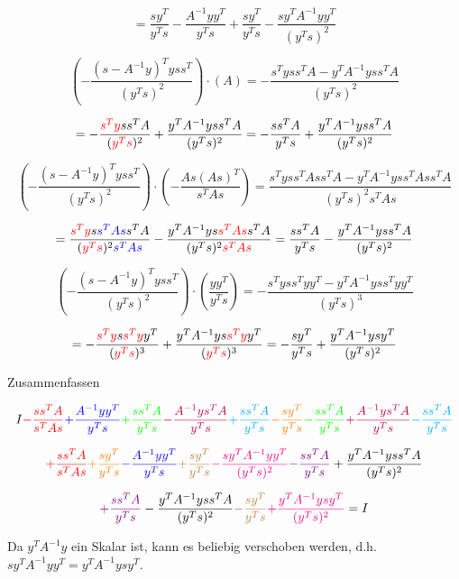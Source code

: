 \documentclass[a4paper, 12pt]{report}
\begin{document}
$$= \frac{sy^T}{y^Ts} - \frac{A^{-1}yy^T}{y^Ts} + \frac{sy^T}{y^Ts} - \frac{sy^TA^{-1}yy^T}{(y^Ts)^2}$$

$$\left( - \frac{(s - A^{-1}y)^Tyss^T}{(y^Ts)^2} \right)\cdot \left(A \right) = -\frac{s^Tyss^TA - y^TA^{-1}yss^TA}{(y^Ts)^2}$$

$$= -\frac{\textcolor{red}{s^Ty}ss^TA}{(\textcolor{red}{y^Ts})^2} + \frac{y^TA^{-1}yss^TA}{(y^Ts)^2} = -\frac{ss^TA}{y^Ts} + \frac{y^TA^{-1}yss^TA}{(y^Ts)^2}$$

$$\left(  - \frac{(s - A^{-1}y)^Tyss^T}{(y^Ts)^2} \right)\cdot \left( - \frac{As(As)^T}{s^TAs} \right) = \frac{s^Tyss^TAss^TA - y^TA^{-1}yss^TAss^TA}{(y^Ts)^2s^TAs}$$

$$= \frac{\textcolor{red}{s^Ty}s\textcolor{blue}{s^TAs}s^TA}{(\textcolor{red}{y^Ts})^2\textcolor{blue}{s^TAs}} - \frac{y^TA^{-1}ys\textcolor{red}{s^TAs}s^TA}{(y^Ts)^2\textcolor{red}{s^TAs}} = \frac{ss^TA}{y^Ts} - \frac{y^TA^{-1}yss^TA}{(y^Ts)^2}$$

$$\left(  - \frac{(s - A^{-1}y)^Tyss^T}{(y^Ts)^2} \right)\cdot \left( \frac{yy^T}{y^Ts} \right) = -\frac{s^Tyss^Tyy^T - y^TA^{-1}yss^Tyy^T}{(y^Ts)^3} $$

$$= -\frac{\textcolor{red}{s^Ty}s\textcolor{red}{s^Ty}y^T}{(\textcolor{red}{y^Ts})^3} + \frac{y^TA^{-1}ys\textcolor{red}{s^Ty}y^T}{(\textcolor{red}{y^Ts})^3} = -\frac{sy^T}{y^Ts} + \frac{y^TA^{-1}ysy^T}{(y^Ts)^2}$$

Zusammenfassen

$$ I \textcolor{red}{-\frac{ss^TA}{s^TAs}} \textcolor{blue}{+\frac{A^{-1}yy^T}{y^Ts}} \textcolor{green}{+\frac{ss^TA}{y^Ts}} \textcolor{purple}{-\frac{A^{-1}ys^TA}{y^Ts}} \textcolor{cyan}{+\frac{ss^TA}{y^Ts}} \textcolor{orange}{-\frac{sy^T}{y^Ts}} \textcolor{green}{-\frac{ss^TA}{y^Ts}}  \textcolor{purple}{+\frac{A^{-1}ys^TA}{y^Ts}} \textcolor{cyan}{-\frac{ss^TA}{y^Ts}} $$

$$ \textcolor{red}{+\frac{ss^TA}{s^TAs}} \textcolor{orange}{+\frac{sy^T}{y^Ts}} \textcolor{blue}{-\frac{A^{-1}yy^T}{y^Ts}} \textcolor{brown}{+\frac{sy^T}{y^Ts}} \textcolor{magenta}{-\frac{sy^TA^{-1}yy^T}{(y^Ts)^2}} \textcolor{violet}{-\frac{ss^TA}{y^Ts}} + \frac{y^TA^{-1}yss^TA}{(y^Ts)^2} $$

$$ \textcolor{violet}{+\frac{ss^TA}{y^Ts}} - \frac{y^TA^{-1}yss^TA}{(y^Ts)^2} \textcolor{brown}{-\frac{sy^T}{y^Ts}} \textcolor{magenta}{+\frac{y^TA^{-1}ysy^T}{(y^Ts)^2}} = I $$ 

Da $y^TA^{-1}y$ ein Skalar ist, kann es beliebig verschoben werden, d.h. $sy^TA^{-1}yy^T = y^TA^{-1}ysy^T$.
\end{document}

